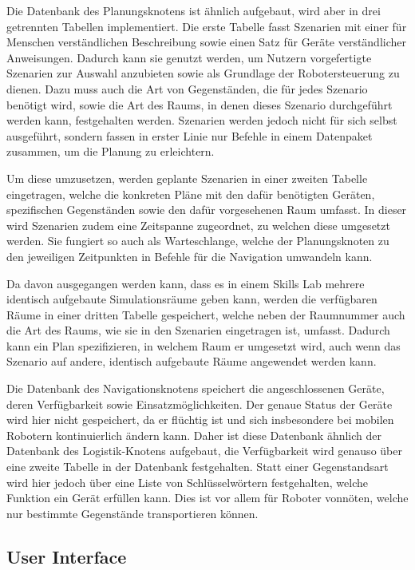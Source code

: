 Die Datenbank des Planungsknotens ist ähnlich aufgebaut, wird aber in drei getrennten Tabellen implementiert. Die erste Tabelle fasst Szenarien mit einer für Menschen verständlichen Beschreibung sowie einen Satz für Geräte verständlicher Anweisungen. Dadurch kann sie genutzt werden, um Nutzern vorgefertigte Szenarien zur Auswahl anzubieten sowie als Grundlage der Robotersteuerung zu dienen. Dazu muss auch die Art von Gegenständen, die für jedes Szenario benötigt wird, sowie die Art des Raums, in denen dieses Szenario durchgeführt werden kann, festgehalten werden. Szenarien werden jedoch nicht für sich selbst ausgeführt, sondern fassen in erster Linie nur Befehle in einem Datenpaket zusammen, um die Planung zu erleichtern.

Um diese umzusetzen, werden geplante Szenarien in einer zweiten Tabelle eingetragen, welche die konkreten Pläne mit den dafür benötigten Geräten, spezifischen Gegenständen sowie den dafür vorgesehenen Raum umfasst. In dieser wird Szenarien zudem eine Zeitspanne zugeordnet, zu welchen diese umgesetzt werden. Sie fungiert so auch als Warteschlange, welche der Planungsknoten zu den jeweiligen Zeitpunkten in Befehle für die Navigation umwandeln kann.

Da davon ausgegangen werden kann, dass es in einem Skills Lab mehrere identisch aufgebaute Simulationsräume geben kann, werden die verfügbaren Räume in einer dritten Tabelle gespeichert, welche neben der Raumnummer auch die Art des Raums, wie sie in den Szenarien eingetragen ist, umfasst. Dadurch kann ein Plan spezifizieren, in welchem Raum er umgesetzt wird, auch wenn das Szenario auf andere, identisch aufgebaute Räume angewendet werden kann.

Die Datenbank des Navigationsknotens speichert die angeschlossenen Geräte, deren Verfügbarkeit sowie Einsatzmöglichkeiten. Der genaue Status der Geräte wird hier nicht gespeichert, da er flüchtig ist und sich insbesondere bei mobilen Robotern kontinuierlich ändern kann. Daher ist diese Datenbank ähnlich der Datenbank des Logistik-Knotens aufgebaut, die Verfügbarkeit wird genauso über eine zweite Tabelle in der Datenbank festgehalten. Statt einer Gegenstandsart wird hier jedoch über eine Liste von Schlüsselwörtern festgehalten, welche Funktion ein Gerät erfüllen kann. Dies ist vor allem für Roboter vonnöten, welche nur bestimmte Gegenstände transportieren können.



\FloatBarrier
\subsection{User Interface}

